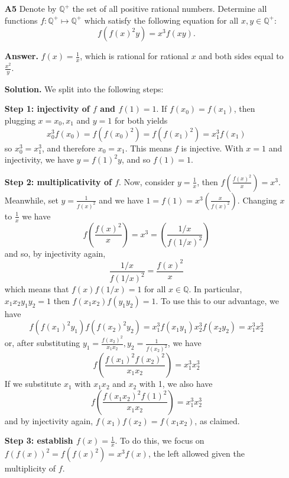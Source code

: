 \documentclass[11pt]{article}
\newcommand{\bbQ}{\mathbb Q}
\newcommand{\<}{\langle}
\renewcommand{\>}{\rangle}
\begin{document}
\begin{enumerate}
	\item[\textbf{A5}] 
	Denote by $\mathbb{Q}^+$ the set of all positive rational numbers. Determine all functions $f : \mathbb{Q}^+ \mapsto \mathbb{Q}^+$ which satisfy the following equation for all $x, y \in \mathbb{Q}^+:$\[f\left( f(x)^2y \right) = x^3 f(xy).\]
	
	\textbf{Answer.} $f(x)=\frac 1x$, which is rational for rational $x$ and both sides equal to $\frac{x^2}{y}$. 
	
	\textbf{Solution.} 
	We split into the following steps: 
	
	\textbf{Step 1: injectivity of $f$ and $f(1)=1$}. 
	If $f(x_0)=f(x_1)$, then plugging $x=x_0, x_1$ and $y=1$ for both yields 
	\[
	x_0^3f(x_0)=f\left( f(x_0)^2 \right)=f\left( f(x_1)^2 \right)=x_1^3f(x_1)
	\]
	so $x_0^3=x_1^3$, and therefore $x_0=x_1$. 
	This means $f$ is injective. 
	With $x=1$ and injectivity, we have $y=f(1)^2y$, and so $f(1)=1$. 
	
	\textbf{Step 2: multiplicativity of $f$}. 
	Now, consider $y=\frac{1}{x}$, then $f\left(\frac{f(x)^2}{x}\right)=x^3$. 
	Meanwhile, set $y=\frac{1}{f(x)^2}$ and we have $1=f(1)=x^3\left(\frac{x}{f(x)^2}\right)$. 
	Changing $x$ to $\frac{1}{x}$ we have 
	\[
	f\left(\frac{f(x)^2}{x}\right)=x^3
	=\left(\frac{1/x}{f(1/x)^2}\right)
	\]
	and so, by injectivity again, 
	\[
	\frac{1/x}{f(1/x)^2}=\frac{f(x)^2}{x}
	\]
	which means that $f(x)f(1/x)=1$ for all $x\in\bbQ$. 
	In particular, $x_1x_2y_1y_2=1$ then $f(x_1x_2)f(y_1y_2)=1$. 
	To use this to our advantage, we have 
	\[
	f\left( f(x_1)^2y_1 \right)f\left( f(x_2)^2y_2 \right)
	=x_1^3 f(x_1y_1)x_2^3 f(x_2y_2)=x_1^3x_2^3
	\]
	or, after substituting $y_1=\frac{f(x_2)^2}{x_1x_2}, y_2=\frac{1}{f(x_2)^2}$, we have 
	\[
	f\left( \frac{f(x_1)^2f(x_2)^2}{x_1x_2} \right) = x_1^3x_2^3
	\]
	If we substitute $x_1$ with $x_1x_2$ and $x_2$ with 1, we also have 
	\[
	f\left( \frac{f(x_1x_2)^2f(1)^2}{x_1x_2} \right) = x_1^3x_2^3
	\]
	and by injectivity again, $f(x_1)f(x_2)=f(x_1x_2)$, as claimed. 
	
	\textbf{Step 3: establish $f(x)=\frac 1x$}. 
	To do this, we focus on $f(f(x))^2=f(f(x)^2)=x^3f(x)$, the left allowed given the multiplicity of $f$. 
	

\end{enumerate}
\end{document}
